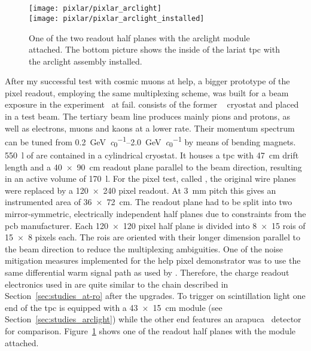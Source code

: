 \section{\pixlar{}}
\label{sec:ac_pixlar}

\begin{figure}[htb]
	\centering
	\texttt{[image: pixlar/pixlar\_arclight]}\\
	\texttt{[image: pixlar/pixlar\_arclight\_installed]}
	\caption[\pixlar{} half plane with attached  module]{%
		One of the two \pixlar{} readout half planes with the \acrshort{arclight} module attached.
		The bottom picture shows the inside of the \acrshort{lariat} \acrshort{tpc} with the \pixlar{} \acrshort{arclight} assembly installed.
	}
	\label{fig:pixlar_arclight}
\end{figure}

After my successful test with cosmic muons at \gls{help}, a bigger prototype of the pixel readout, employing the same multiplexing scheme, was built for a beam exposure in the \lariat{} experiment~\cite{lariat} at \gls{fail}.
\lariat{} consists of the former \argoneut{}~\cite{argoneut} cryostat and \lartpc{} placed in a test beam.
The tertiary beam line produces mainly pions and protons, as well as electrons, muons and kaons at a lower rate.
Their momentum spectrum can be tuned from \SIrange{0.2}{2.0}{\giga\electronvolt\per\clight} by means of bending magnets.
\SI{550}{\litre} of \lar{} are contained in a cylindrical cryostat.
It houses a \gls{tpc} with \SI{47}{\centi\metre} drift length and a \SI{40 x 90}{\centi\metre} readout plane parallel to the beam direction, resulting in an active volume of \SI{170}{\litre}.
For the pixel test, called \pixlar{}, the original wire planes were replaced by a \num{120 x 240} pixel readout.
At \SI{3}{\milli\metre} pitch this gives an instrumented area of \SI{36 x 72}{\centi\metre}.
The readout plane had to be split into two mirror-symmetric, electrically independent half planes due to constraints from the \gls{pcb} manufacturer.
Each \num{120 x 120} pixel half plane is divided into \num{8 x 15} \glspl{roi} of \num{15 x 8} pixels each.
The \glspl{roi} are oriented with their longer dimension parallel to the beam direction to reduce the multiplexing ambiguities.
One of the noise mitigation measures implemented for the \gls{help} pixel demonstrator was to use the same differential warm signal path as used by \lariat{}.
Therefore, the charge readout electronics used in \pixlar{} are quite similar to the \AT{} chain described in Section~\ref{sec:studies_at-ro} after the upgrades.
To trigger on scintillation light one end of the \gls{tpc} is equipped with a \SI{43 x 15}{\centi\metre} \AL{} module (see Section~\ref{sec:studies_arclight}) while the other end features an \gls{arapuca}~\cite{arapuca} detector for comparison.
Figure~\ref{fig:pixlar_arclight} shows one of the readout half planes with the \AL{} module attached.

